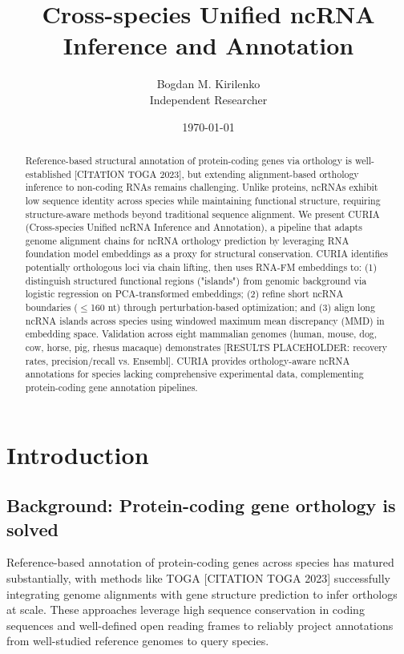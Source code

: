 \documentclass[11pt]{article}
\title{Cross-species Unified ncRNA Inference and Annotation}
\author{Bogdan M. Kirilenko\\
Independent Researcher}
\date{\today}
\begin{document}
\linenumbers
\maketitle

\begin{abstract}
Reference-based structural annotation of protein-coding genes via orthology is well-established [CITATION TOGA 2023], but extending alignment-based orthology inference to non-coding RNAs remains challenging. Unlike proteins, ncRNAs exhibit low sequence identity across species while maintaining functional structure, requiring structure-aware methods beyond traditional sequence alignment. We present CURIA (Cross-species Unified ncRNA Inference and Annotation), a pipeline that adapts genome alignment chains for ncRNA orthology prediction by leveraging RNA foundation model embeddings as a proxy for structural conservation. CURIA identifies potentially orthologous loci via chain lifting, then uses RNA-FM embeddings to: (1) distinguish structured functional regions ("islands") from genomic background via logistic regression on PCA-transformed embeddings; (2) refine short ncRNA boundaries ($\leq$160 nt) through perturbation-based optimization; and (3) align long ncRNA islands across species using windowed maximum mean discrepancy (MMD) in embedding space. Validation across eight mammalian genomes (human, mouse, dog, cow, horse, pig, rhesus macaque) demonstrates [RESULTS PLACEHOLDER: recovery rates, precision/recall vs. Ensembl]. CURIA provides orthology-aware ncRNA annotations for species lacking comprehensive experimental data, complementing protein-coding gene annotation pipelines.
\end{abstract}

\section{Introduction}

\subsection{Background: Protein-coding gene orthology is solved}
Reference-based annotation of protein-coding genes across species has matured substantially, with methods like TOGA [CITATION TOGA 2023] successfully integrating genome alignments with gene structure prediction to infer orthologs at scale. These approaches leverage high sequence conservation in coding sequences and well-defined open reading frames to reliably project annotations from well-studied reference genomes to query species.
\end{document}
